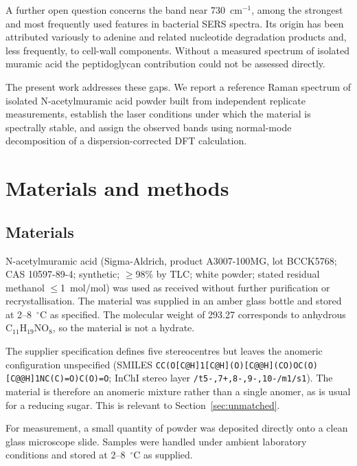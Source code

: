 \documentclass[11pt,a4paper]{article}
\newcommand{\wn}{\ensuremath{\mathrm{cm}^{-1}}}
\begin{document}
A further open question concerns the band near 730~\wn{}, among the strongest
and most frequently used features in bacterial SERS spectra. Its origin has been
attributed variously to adenine and related nucleotide degradation products
\cite{premasiri2016origins, kubryk2016origin} and, less frequently, to cell-wall
components. Without a measured spectrum of isolated muramic acid the
peptidoglycan contribution could not be assessed directly.

The present work addresses these gaps. We report a reference Raman spectrum of
isolated N-acetylmuramic acid powder built from independent replicate
measurements, establish the laser conditions under which the material is
spectrally stable, and assign the observed bands using normal-mode decomposition
of a dispersion-corrected DFT calculation.

\section{Materials and methods}

\subsection{Materials}

N-acetylmuramic acid (Sigma-Aldrich, product A3007-100MG, lot BCCK5768;
CAS 10597-89-4; synthetic; $\geq$98\% by TLC; white powder; stated residual
methanol $\leq$1~mol/mol) was used as received without further purification or
recrystallisation. The material was supplied in an amber glass bottle and stored
at 2--8~$^{\circ}$C as specified. The molecular weight of 293.27 corresponds to
anhydrous C$_{11}$H$_{19}$NO$_8$, so the material is not a hydrate.

The supplier specification defines five stereocentres but leaves the anomeric
configuration unspecified (SMILES
\texttt{CC(O[C@H]1[C@H](O)[C@@H](CO)OC(O)[C@@H]1NC(C)=O)C(O)=O}; InChI stereo
layer \texttt{/t5-,7+,8-,9-,10-/m1/s1}). The material is therefore an anomeric
mixture rather than a single anomer, as is usual for a reducing sugar. This is
relevant to Section~\ref{sec:unmatched}.

For measurement, a small quantity of powder was deposited directly onto a clean
glass microscope slide. Samples were handled under ambient laboratory conditions
and stored at 2--8~$^\circ$C as supplied.
\end{document}
